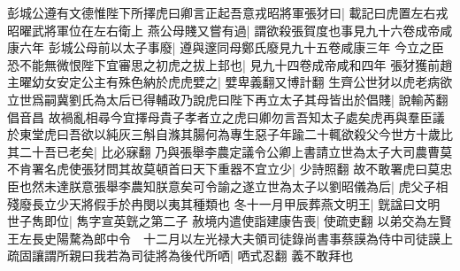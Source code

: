 彭城公遵有文德惟陛下所擇虎曰卿言正起吾意戎昭將軍張犲曰|{
	載記曰虎置左右戎昭曜武將軍位在左右衛上}
燕公母賤又嘗有過|{
	謂欲殺張賀度也事見九十六卷成帝咸康六年}
彭城公母前以太子事廢|{
	遵與邃同母鄭氏廢見九十五卷咸康三年}
今立之臣恐不能無微恨陛下宜審思之初虎之拔上邽也|{
	見九十四卷成帝咸和四年}
張犲獲前趙主曜幼女安定公主有殊色納於虎虎嬖之|{
	嬖卑義翻又博計翻}
生齊公世犲以虎老病欲立世爲嗣冀劉氏為太后已得輔政乃說虎曰陛下再立太子其母皆出於倡賤|{
	說輸芮翻倡音昌}
故禍亂相尋今宜擇母貴子孝者立之虎曰卿勿言吾知太子處矣虎再與羣臣議於東堂虎曰吾欲以純灰三斛自滌其腸何為專生惡子年踰二十輒欲殺父今世方十歲比其二十吾已老矣|{
	比必寐翻}
乃與張舉李農定議令公卿上書請立世為太子大司農曹莫不肯署名虎使張犲問其故莫頓首曰天下重器不宜立少|{
	少詩照翻}
故不敢署虎曰莫忠臣也然未達朕意張舉李農知朕意矣可令諭之遂立世為太子以劉昭儀為后|{
	虎父子相殘廢長立少天將假手於冉閔以夷其種類也}
冬十一月甲辰葬燕文明王|{
	皝諡曰文明}
世子雋即位|{
	雋字宣英皝之第二子}
赦境内遣使詣建康告喪|{
	使疏吏翻}
以弟交為左賢王左長史陽騖為郎中令　十二月以左光禄大夫領司徒錄尚書事蔡謨為侍中司徒謨上疏固讓謂所親曰我若為司徒將為後代所哂|{
	哂式忍翻}
義不敢拜也

